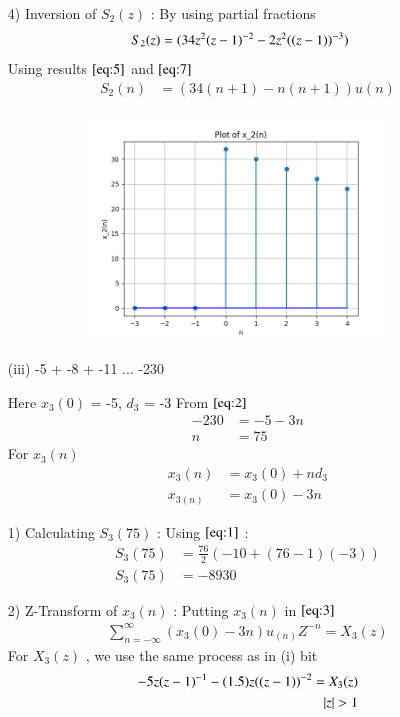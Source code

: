 \documentclass[journal,12pt,twocolumn]{IEEEtran}
\theoremstyle{remark}
\begin{document}
\begin{enumerate}
    \item[4)]
Inversion of $S_2(z)$ :
By using partial fractions 
\begin{align}
    S_2(z) &= \notag(34z^2(z-1)^{-2} - 2z^2((z-1))^{-3}) 
\end{align}
Using results $\eqref{eq:5}$ and $\eqref{eq:7}$
\begin{align}
 S_2(n) &= (34(n+1) - n(n+1))u(n)   
\end{align}

\begin{figure}[!ht]
\centering
  \graphicspath{ {figs/} }
\includegraphics[width=10cm, height=6cm]{graph_2}
\captionsetup{Graph:2 $x_2(n)$ vs n }
\label{graph:3}
\end{figure}

\vspace{1.5cm} 
\item[(iii)]
-5 + -8 + -11 ... -230
\vspace{0.2cm}

Here $x_3(0)$ = -5, $d_3$ = -3\vspace{0.05cm}
From $\eqref{eq:2}$
\begin{align}
-230 &= -5 -3n \\
n &= 75
\end{align}
For $x_3(n)$
\begin{align}
x_3(n) &= x_3(0) + nd_3\\
x_{3(n)} &= x_3(0) - 3n
\end{align}


\item[1)]
Calculating $S_3(75)$ :
Using $\eqref{eq:1}$ :\vspace{0.05cm}
\begin{align}
    S_3(75) &= \frac{76}{2}(-10+(76-1)(-3))\\
   S_3(75) &= -8930
    \end{align}

\item[2)] 
Z-Transform of $x_3(n)$ :
Putting $x_3(n)$ in $\eqref{eq:3}$
\vspace{0.05cm}
\begin{align}
\sum_{n=-\infty}^{\infty}(x_3(0) -3n)u_{(n)}Z^{-n} =X_3(z)
\end{align}
For $X_3(z)$ , we use the same process as in (i) bit\vspace{0.05cm}
\begin{align}
  \notag -5z(z-1)^{-1}-
       (1.5)z((z-1))^{-2}=X_3(z) \label{eq:8}\\
           \lvert z\rvert  >  1 
\end{align}


\end{enumerate}
\end{document}
